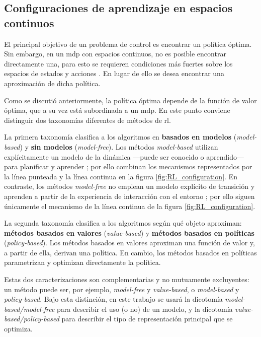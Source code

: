\subsection{Configuraciones de aprendizaje en espacios continuos}

El principal objetivo de un problema de control es encontrar un política óptima. Sin embargo, en un \acrshort{mdp} con espacios continuos, no es posible encontrar directamente una, para esto se requieren condiciones más fuertes sobre los espacios de estados y acciones \cite{Sutton2018}. En lugar de ello se desea encontrar una aproximación de dicha política. 

Como se discutió anteriormente, la política óptima depende de la función de valor óptima, que a su vez está subordinada a un \acrshort{mdp}. En este punto conviene distinguir dos taxonomías diferentes de métodos de \acrshort{rl}.

La primera taxonomía clasifica a los algoritmos en \textbf{basados en modelos} (\textit{model-based}) y \textbf{sin modelos} (\textit{model-free}). Los métodos \textit{model-based} utilizan explícitamente un modelo de la dinámica —puede ser conocido o aprendido— para planificar y aprender \cite{Moerland2018}; por ello combinan los mecanismos representados por la línea punteada y la línea continua en la figura \ref{fig:RL_configuration}. En contraste, los métodos \textit{model-free} no emplean un modelo explícito de transición y aprenden a partir de la experiencia de interacción con el entorno \cite{Moerland2018}; por ello siguen únicamente el mecanismo de la línea continua de la figura \ref{fig:RL_configuration}.

La segunda taxonomía clasifica a los algoritmos según qué objeto aproximan: \textbf{métodos basados en valores} (\textit{value-based}) y \textbf{métodos basados en políticas} (\textit{policy-based}). Los métodos basados en valores aproximan una función de valor y, a partir de ella, derivan una política. En cambio, los métodos basados en políticas parametrizan y optimizan directamente la política. \cite{franccois2018}

Estas dos caracterizaciones son complementarias y no mutuamente excluyentes: un método puede ser, por ejemplo, \textit{model-free} y \textit{value-based}, o \textit{model-based} y \textit{policy-based}. Bajo esta distinción, en este trabajo se usará la dicotomía \textit{model-based/model-free} para describir el uso (o no) de un modelo, y la dicotomía \textit{value-based/policy-based} para describir el tipo de representación principal que se optimiza.


